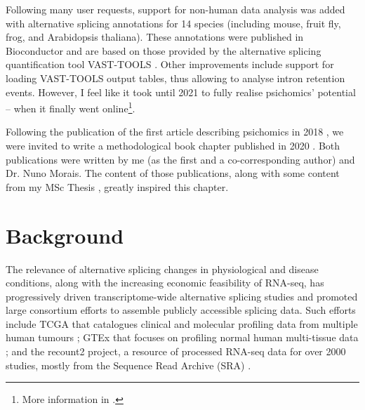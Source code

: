 Following many user requests, support for non-human data analysis was added with alternative splicing annotations for 14 species (including mouse, fruit fly, frog, and Arabidopsis thaliana). These annotations were published in Bioconductor and are based on those provided by the alternative splicing quantification tool VAST-TOOLS \cite{irimia:2014wt,tapial:2017ui}. Other improvements include support for loading VAST-TOOLS output tables, thus allowing to analyse intron retention events. However, I feel like it took until 2021 to fully realise psichomics' potential -- when it finally went online\footnote{More information in .}.

Following the publication of the first article describing psichomics in 2018 \cite{saraiva-agostinho:2018uq}, we were invited to write a methodological book chapter published in 2020 \cite{saraiva-agostinho:2020wz}. Both publications were written by me (as the first and a co-corresponding author) and Dr. Nuno Morais. The content of those publications, along with some content from my MSc Thesis \cite{saraiva-agostinho:2016vw}, greatly inspired this chapter.

\section{Background}


The relevance of alternative splicing changes in physiological and disease conditions, along with the increasing economic feasibility of RNA-seq, has progressively driven transcriptome-wide alternative splicing studies \cite{wang:2008wa,tsai:2015ve,danan-gotthold:2015ut,chhibber:2017wm,climente-gonzalez:2017uj} and promoted large consortium efforts to assemble publicly accessible splicing data. Such efforts include TCGA that catalogues clinical and molecular profiling data from multiple human tumours \cite{chang:2013ww}; GTEx that focuses on profiling normal human multi-tissue data \cite{lonsdale:2013uo}; and the recount2 project, a resource of processed RNA-seq data for over 2000 studies, mostly from the Sequence Read Archive (SRA) \cite{collado-torres:2017uw}.

